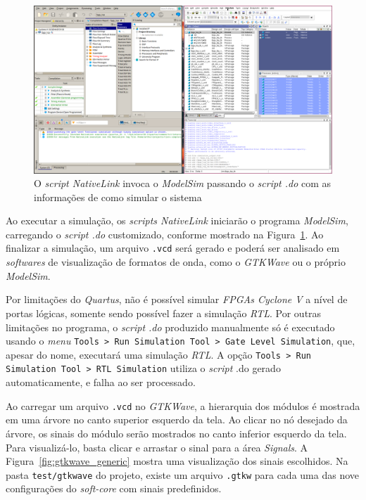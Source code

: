     \begin{figure}[H]
    \centering
        \includegraphics[width=.95\linewidth]{../images/quartus/quartus_modelsim.png}
        \caption{O \textit{script NativeLink} invoca o \textit{ModelSim} passando
            o \textit{script .do} com as informações de como simular o sistema}
        \label{fig:quartus_modelsim}
    \end{figure}

    { Ao executar a simulação, os \textit{scripts NativeLink} iniciarão o
        programa \textit{ModelSim}, carregando o \textit{script .do} customizado,
        conforme mostrado na Figura~\ref{fig:quartus_modelsim}. Ao finalizar a
        simulação, um arquivo \texttt{.vcd} será gerado e poderá ser analisado
        em \textit{softwares} de visualização de formatos de onda, como o
        \textit{GTKWave} ou o próprio \textit{ModelSim}.
    }

    { Por limitações do \textit{Quartus}, não é possível simular
        \textit{FPGAs Cyclone V} a nível de portas lógicas, somente sendo possível
        fazer a simulação \textit{RTL}. Por outras limitações no programa, o
        \textit{script .do} produzido manualmente só é executado usando o
        \textit{menu} \texttt{Tools > Run Simulation Tool > Gate Level Simulation},
        que, apesar do nome, executará uma simulação \textit{RTL}. A opção
        \texttt{Tools > Run Simulation Tool > RTL Simulation} utiliza o \textit{script}
        .do gerado automaticamente, e falha ao ser processado.
    }

    { Ao carregar um arquivo \texttt{.vcd} no \textit{GTKWave}, a hierarquia
        dos módulos é mostrada em uma árvore no canto superior esquerdo da tela.
        Ao clicar no nó desejado da árvore, os sinais do módulo serão mostrados
        no canto inferior esquerdo da tela. Para visualizá-lo, basta clicar e
        arrastar o sinal para a área \textit{Signals}. A Figura~\ref{fig:gtkwave_generic}
        mostra uma visualização dos sinais escolhidos. Na pasta \texttt{test/gtkwave}
        do projeto, existe um arquivo \texttt{.gtkw} para cada uma das nove
        configurações do \textit{soft-core} com sinais predefinidos.
    }

